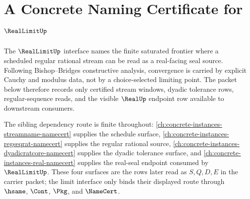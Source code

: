 \chapter{A Concrete Naming Certificate for $\RealLimitUp$}
\label{ch:concrete-instances-reallimit-namecert}

The $\RealLimitUp$ interface names the finite saturated frontier where a
scheduled regular rational stream can be read as a real-facing seal source.
Following Bishop--Bridges constructive analysis, convergence is carried by
explicit Cauchy and modulus data, not by a choice-selected limiting point. The
packet below therefore records only certified stream windows, dyadic tolerance
rows, regular-sequence reads, and the visible $\RealUp$ endpoint row available
to downstream consumers.

The sibling dependency route is finite throughout: \autoref{ch:concrete-instances-streamname-namecert} supplies the schedule surface, \autoref{ch:concrete-instances-regseqrat-namecert} supplies the regular rational source, \autoref{ch:concrete-instances-dyadicratcore-namecert} supplies the dyadic tolerance surface, and \autoref{ch:concrete-instances-real-namecert} supplies the real-seal endpoint consumed by $\RealLimitUp$. These four surfaces are the rows later read as $S,Q,D,E$ in the carrier packet; the limit interface only binds their displayed route through $\hsame$, $\Cont$, $\Pkg$, and $\NameCert$.

